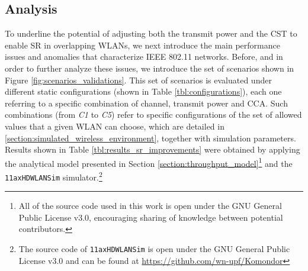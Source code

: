 \documentclass{article}
\begin{document}
\subsection{Analysis}
\label{section:spatial_reuse_enhancement}  
To underline the potential of adjusting both the transmit power and the CST to enable SR in overlapping WLANs, we next introduce the main performance issues and anomalies that characterize IEEE 802.11 networks. Before, and in order to further analyze these issues, we introduce the set of scenarios shown in Figure \ref{fig:scenarios_validations}. This set of scenarios is evaluated under different static configurations (shown in Table \ref{tbl:configurations}), each one referring to a specific combination of channel, transmit power and CCA. Such combinations (from \emph{C1} to \emph{C5}) refer to specific configurations of the set of allowed values that a given WLAN can choose, which are detailed in \ref{section:simulated_wireless_environment}, together with simulation parameters. Results shown in Table \ref{tbl:results_sr_improvements} were obtained by applying the analytical model presented in Section \ref{section:throughput_model}\footnote{All of the source code used in this work is open \cite{fwilhelmi2018code} under the GNU General Public License v3.0, encouraging sharing of knowledge between potential contributors.} and the \texttt{11axHDWLANSim} simulator.\footnote{The source code of \texttt{11axHDWLANSim} is open under the GNU General Public License v3.0 and can be found at \url{https://github.com/wn-upf/Komondor}}
\end{document}
